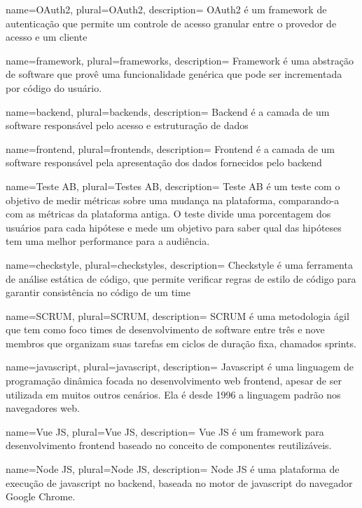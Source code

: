 {
  name=OAuth2,
  plural=OAuth2,
  description={
    OAuth2 é um framework de autenticação que permite um controle de acesso granular entre o provedor de acesso e um cliente
  }
}

{
  name=framework,
  plural=frameworks,
  description={
    Framework é uma abstração de software que provê uma funcionalidade genérica que pode ser incrementada por código do usuário.
  }
}

{
  name=backend,
  plural=backends,
  description={
    Backend é a camada de um software responsável pelo acesso e estruturação de dados
  }
}

{
  name=frontend,
  plural=frontends,
  description={
    Frontend é a camada de um software responsável pela apresentação dos dados fornecidos pelo \gls{backend}
  }
}

{
  name=Teste AB,
  plural=Testes AB,
  description={
    Teste AB é um teste com o objetivo de medir métricas sobre uma mudança na plataforma, comparando-a com as métricas da plataforma antiga. O teste divide uma porcentagem dos usuários para cada hipótese e mede um objetivo para saber qual das hipóteses tem uma melhor performance para a audiência.
  }
}

{
  name=checkstyle,
  plural=checkstyles,
  description={
    Checkstyle é uma ferramenta de análise estática de código, que permite verificar regras de estilo de código para garantir consistência no código de um time
  }
}

{
  name=SCRUM,
  plural=SCRUM,
  description={
    SCRUM é uma metodologia ágil que tem como foco times de desenvolvimento de software entre três e nove membros que organizam suas tarefas em ciclos de duração fixa, chamados sprints.
  }
}

{
  name=javascript,
  plural=javascript,
  description={
    Javascript é uma linguagem de programação dinâmica focada no desenvolvimento web \gls{frontend}, apesar de ser utilizada em muitos outros cenários. Ela é desde 1996 a linguagem padrão nos navegadores web.
  }
}

{
  name=Vue JS,
  plural=Vue JS,
  description={
    Vue JS é um \gls{framework} para desenvolvimento \gls{frontend} baseado no conceito de componentes reutilizáveis.
  }
}

{
  name=Node JS,
  plural=Node JS,
  description={
    Node JS é uma plataforma de execução de \gls{javascript} no \gls{backend}, baseada no motor de \gls{javascript} do navegador Google Chrome.
  }
}


